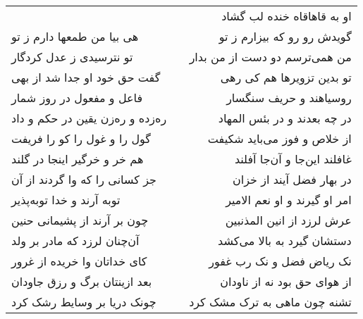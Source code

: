 \begin{center}
\begin{longtable}{l p{0.5cm} r}
&&
او به قاهاقاه خنده لب گشاد
\\
هی بیا من طمعها دارم ز تو
&&
گویدش رو رو که بیزارم ز تو
\\
تو نترسیدی ز عدل کردگار
&&
من همی‌ترسم دو دست از من بدار
\\
گفت حق خود او جدا شد از بهی
&&
تو بدین تزویرها هم کی رهی
\\
فاعل و مفعول در روز شمار
&&
روسیاهند و حریف سنگسار
\\
ره‌زده و ره‌زن یقین در حکم و داد
&&
در چه بعدند و در بئس المهاد
\\
گول را و غول را کو را فریفت
&&
از خلاص و فوز می‌باید شکیفت
\\
هم خر و خرگیر اینجا در گلند
&&
غافلند این‌جا و آن‌جا آفلند
\\
جز کسانی را که وا گردند از آن
&&
در بهار فضل آیند از خزان
\\
توبه آرند و خدا توبه‌پذیر
&&
امر او گیرند و او نعم الامیر
\\
چون بر آرند از پشیمانی حنین
&&
عرش لرزد از انین المذنبین
\\
آن‌چنان لرزد که مادر بر ولد
&&
دستشان گیرد به بالا می‌کشد
\\
کای خداتان وا خریده از غرور
&&
نک ریاض فضل و نک رب غفور
\\
بعد ازینتان برگ و رزق جاودان
&&
از هوای حق بود نه از ناودان
\\
چونک دریا بر وسایط رشک کرد
&&
تشنه چون ماهی به ترک مشک کرد
\\
\end{longtable}
\end{center}
